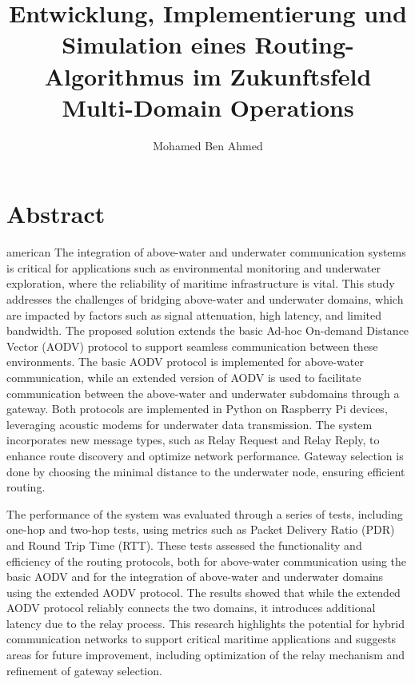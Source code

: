 \documentclass[]{nsm-thesis}
\author{Mohamed Ben Ahmed}
\title{Entwicklung, Implementierung und Simulation
eines Routing-Algorithmus im Zukunftsfeld
Multi-Domain Operations}
\begin{document}

\maketitle

\cleardoublepage



\chapter*{Abstract}
\begin{otherlanguage*}{american}
The integration of above-water and underwater communication systems is critical for applications such as environmental monitoring and underwater exploration, where the reliability of maritime infrastructure is vital. This study addresses the challenges of bridging above-water and underwater domains, which are impacted by factors such as signal attenuation, high latency, and limited bandwidth. The proposed solution extends the basic Ad-hoc On-demand Distance Vector (AODV) protocol to support seamless communication between these environments. The basic AODV protocol is implemented for above-water communication, while an extended version of AODV is used to facilitate communication between the above-water and underwater subdomains through a gateway. Both protocols are implemented in Python on Raspberry Pi devices, leveraging acoustic modems for underwater data transmission. The system incorporates new message types, such as Relay Request and Relay Reply, to enhance route discovery and optimize network performance. Gateway selection is done by choosing the minimal distance to the underwater node, ensuring efficient routing.

The performance of the system was evaluated through a series of tests, including one-hop and two-hop tests, using metrics such as Packet Delivery Ratio (PDR) and Round Trip Time (RTT). These tests assessed the functionality and efficiency of the routing protocols, both for above-water communication using the basic AODV and for the integration of above-water and underwater domains using the extended AODV protocol. The results showed that while the extended AODV protocol reliably connects the two domains, it introduces additional latency due to the relay process. This research highlights the potential for hybrid communication networks to support critical maritime applications and suggests areas for future improvement, including optimization of the relay mechanism and refinement of gateway selection.


\end{otherlanguage*}
\end{document}
